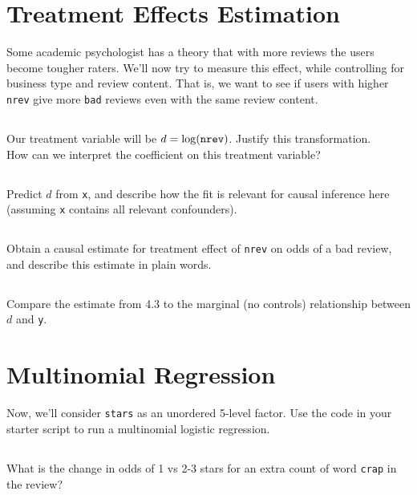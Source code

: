 \documentclass[12pt]{article}
\begin{document}
\newpage
\section{Treatment Effects Estimation}

Some academic psychologist has a theory that with more reviews the users become tougher raters.  We'll now try to measure this effect, while controlling for business type and review content.  That is, we want to see if users with higher {\tt nrev} give more {\tt bad} reviews even with the same review content.

\subsection{} Our treatment variable will be $d=\log({\tt nrev})$. Justify this transformation.\\How can we interpret the coefficient on this treatment variable?

\subsection{}  Predict $d$ from {\tt x}, and describe how the fit is relevant for causal inference here (assuming {\tt x} contains all relevant confounders).

\subsection{} Obtain a causal estimate for treatment effect of {\tt nrev} on odds of a bad review, and describe this estimate in plain words. 

\subsection{} Compare the estimate from 4.3 to the marginal (no controls) relationship between $d$ and {\tt y}.

\newpage
\section{Multinomial Regression}

Now, we'll consider {\tt stars} as an unordered 5-level factor.  Use the code in your starter script to run a multinomial logistic regression.
\subsection{} What is the change in odds of 1 vs 2-3 stars for an extra count of word {\tt crap} in the review? 
\end{document}
